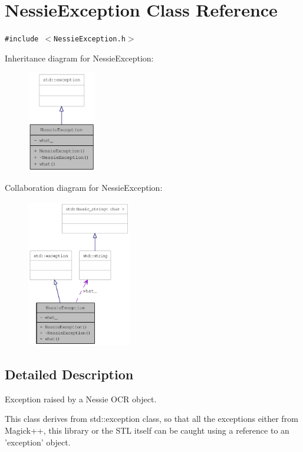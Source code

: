 \hypertarget{class_nessie_exception}{
\section{NessieException Class Reference}
\label{class_nessie_exception}
}
{\tt \#include $<$NessieException.h$>$}

Inheritance diagram for NessieException:\nopagebreak
\begin{figure}[H]
\begin{center}
\leavevmode
\includegraphics[width=85pt]{class_nessie_exception__inherit__graph}
\end{center}
\end{figure}
Collaboration diagram for NessieException:\nopagebreak
\begin{figure}[H]
\begin{center}
\leavevmode
\includegraphics[width=129pt]{class_nessie_exception__coll__graph}
\end{center}
\end{figure}


\subsection{Detailed Description}
Exception raised by a Nessie OCR object. 

This class derives from std::exception class, so that all the exceptions either from Magick++, this library or the STL itself can be caught using a reference to an 'exception' object.

